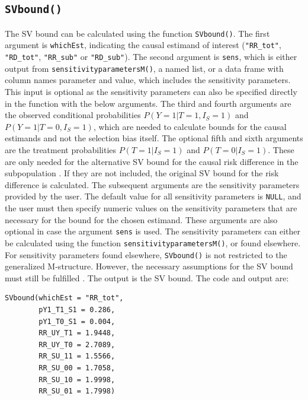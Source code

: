 \subsection{\texorpdfstring{\texttt{SVbound()}}{SVbound()}}\label{svbound}

The SV bound can be calculated using the function \texttt{SVbound()}. The first
argument is \texttt{whichEst}, indicating the causal estimand of interest (\texttt{"RR\_tot"},
\texttt{"RD\_tot"}, \texttt{"RR\_sub"} or \texttt{"RD\_sub"}). The second argument is \texttt{sens}, which is
either output from \texttt{sensitivityparametersM()}, a named list, or a data frame with
column names parameter and value, which includes the sensitivity parameters.
This input is optional as the sensitivity parameters can also be specified
directly in the function with the below arguments. The third and fourth arguments
are the observed conditional probabilities \(P(Y=1|T=1,I_S=1)\) and
\(P(Y=1|T=0,I_S=1)\), which are needed to calculate bounds for the causal
estimands and not the selection bias itself. The optional fifth and sixth
arguments are the treatment probabilities \(P(T=1|I_S=1)\) and \(P(T=0|I_S=1)\).
These are only needed for the alternative SV bound for the causal risk difference
in the subpopulation \citep{zetterstrom2025investigations}. If they are not included,
the original SV bound for the risk difference is calculated. The subsequent
arguments are the sensitivity parameters provided by the user. The default value
for all sensitivity parameters is \texttt{NULL}, and the user must then specify numeric
values on the sensitivity parameters that are necessary for the bound for the
chosen estimand. These arguments are also optional in case the argument \texttt{sens}
is used. The sensitivity parameters can either be calculated using the function
\texttt{sensitivityparametersM()}, or found elsewhere. For sensitivity parameters found
elsewhere, \texttt{SVbound()} is not restricted to the generalized M-structure.
However, the necessary assumptions for the SV bound must still be fulfilled
\citep{smith2019bounding}. The output is the SV bound. The code and output are:

\begin{verbatim}
SVbound(whichEst = "RR_tot",
        pY1_T1_S1 = 0.286,
        pY1_T0_S1 = 0.004,
        RR_UY_T1 = 1.9448,
        RR_UY_T0 = 2.7089,
        RR_SU_11 = 1.5566,
        RR_SU_00 = 1.7058,
        RR_SU_10 = 1.9998,
        RR_SU_01 = 1.7998)
\end{verbatim}

